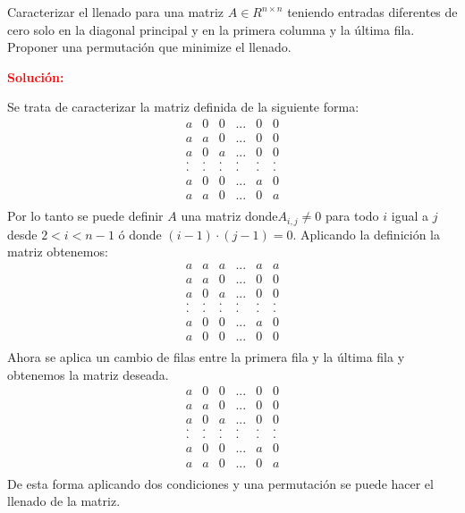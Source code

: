 Caracterizar el llenado para una matriz $A \in R^{n\times n}$ teniendo entradas diferentes de cero solo en la diagonal principal y en la primera columna y la última fila. Proponer una permutación que minimize el llenado.

\noindent \textcolor{red}{\bf Solución:}

Se trata de caracterizar la matriz definida de la siguiente forma:
\begin{equation}
    \begin{array}{cccccc}
        a & 0 & 0 & ...& 0 & 0  \\ 
        a & a & 0 & ...& 0 & 0 \\
        a & 0 & a & ...& 0 & 0 \\
        . & . & . & . & . & .\\
        . & . & . & . & . & .\\
        a & 0 & 0 & ...& a & 0 \\
        a & a & 0 & ...& 0 & a \\
    \end{array}
\end{equation}
Por lo tanto se puede definir $A$ una matriz donde$A_{i,j} \neq 0$ para todo $i$  igual a $j$ desde $ 2 < i < n-1$ ó donde $(i-1)\cdot(j-1) = 0$. Aplicando la definición la matriz obtenemos:
\begin{equation}
    \begin{array}{cccccc}
        a & a & a & ...& a & a  \\ 
        a & a & 0 & ...& 0 & 0 \\
        a & 0 & a & ...& 0 & 0 \\
        . & . & . & . & . & .\\
        . & . & . & . & . & .\\
        a & 0 & 0 & ...& a & 0 \\
        a & 0 & 0 & ...& 0 & 0 \\
    \end{array}
\end{equation}
Ahora se aplica un cambio de filas entre la primera fila y la última fila y obtenemos la matriz deseada.
\begin{equation}
    \begin{array}{cccccc}
    a & 0 & 0 & ...& 0 & 0  \\ 
    a & a & 0 & ...& 0 & 0 \\
    a & 0 & a & ...& 0 & 0 \\
    . & . & . & . & . & .\\
    . & . & . & . & . & .\\
    a & 0 & 0 & ...& a & 0 \\
    a & a & 0 & ...& 0 & a \\
    \end{array}
\end{equation}
De esta forma aplicando dos condiciones y una permutación se puede hacer el llenado de la matriz.